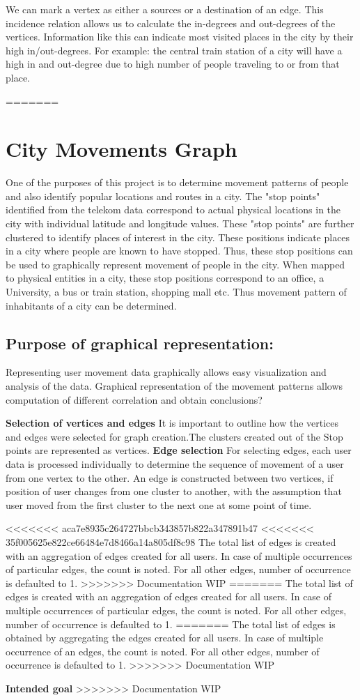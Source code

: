We can mark a vertex as either a sources or a destination of an edge. This incidence relation allows us to calculate the in-degrees and out-degrees of the vertices. Information like this can indicate most visited places in the city by their high in/out-degrees. For example: the central train station of a city will have a high in and out-degree due to high number of people traveling to or from that place.

\FloatBarrier=======
\section{City Movements Graph}
One of the purposes of this project is to determine movement patterns of people and also identify popular locations and routes in a city. The "stop points" identified from the telekom data correspond to actual physical locations in the city with individual latitude and longitude values. These "stop points" are further clustered to identify places of interest in the city. These positions indicate places in a city where people are known to have stopped. Thus, these stop positions can be used to graphically represent movement of people in the city. When mapped to physical entities in a city, these stop positions correspond to an office, a University, a bus or train station, shopping mall etc. Thus movement pattern of inhabitants of a city can be determined.

\subsection {Purpose of graphical representation:} Representing user movement data graphically allows easy visualization and analysis of the data. Graphical representation of the movement patterns allows computation of different correlation and obtain conclusions?

\textbf{Selection of vertices and edges} It is important to outline how the vertices and edges were selected for graph creation.The clusters created out of the Stop points are represented as vertices. 
\textbf{Edge selection} For selecting edges, each user data is processed individually to determine the sequence of movement of a user from one vertex to the other. An edge is constructed between two vertices, if position of user changes from one cluster to another, with the assumption that user moved from the first cluster to the next one at some point of time.

<<<<<<< aca7e8935c264727bbcb343857b822a347891b47
<<<<<<< 35f005625e822ce66484e7d8466a14a805df8c98
The total list of edges is created with an aggregation of edges created for all users. In case of multiple occurrences of particular edges, the count is noted. For all other edges, number of occurrence is defaulted to 1.
>>>>>>> Documentation WIP
=======
The total list of edges is created with an aggregation of edges created for all users. In case of multiple occurrences of particular edges, the count is noted. For all other edges, number of occurrence is defaulted to 1. 
=======
The total list of edges is obtained by aggregating the edges created for all users. In case of multiple occurrence of an edges, the count is noted. For all other edges, number of occurrence is defaulted to 1. 
>>>>>>> Documentation WIP

\textbf{Intended goal}
>>>>>>> Documentation WIP
